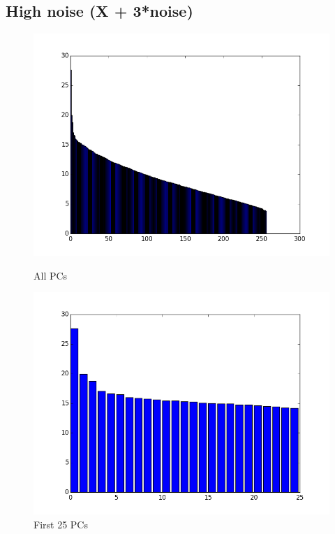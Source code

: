 \documentclass[a4paper,11pt]{article}
\begin{document}
\subsection*{High noise (X + 3*noise)}
\begin{figure}[H]

  \includegraphics[width=\linewidth]{5_b_a_30.png}
  \caption{All PCs}\label{fig:awesome_image1}
\endminipage\hfill
{}
  \includegraphics[width=\linewidth]{5_b_b_30.png}
  \caption{First 25 PCs}\label{fig:awesome_image2}
\endminipage\hfill
{}%

\end{figure}
\end{document}
